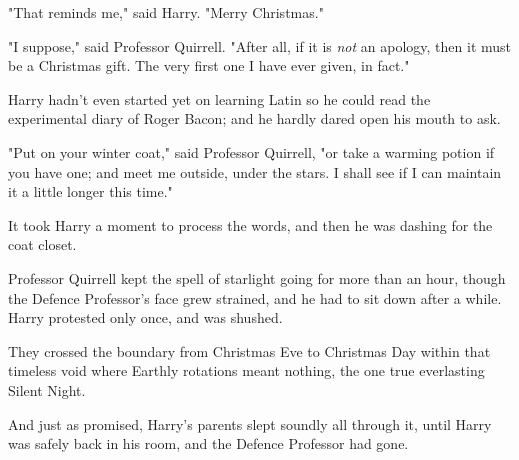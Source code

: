 "That reminds me," said Harry. "Merry Christmas."

"I suppose," said Professor Quirrell. "After all, if it is \emph{not} an
apology, then it must be a Christmas gift. The very first one I have ever
given, in fact."

Harry hadn’t even started yet on learning Latin so he could read the
experimental diary of Roger Bacon; and he hardly dared open his mouth to ask.

"Put on your winter coat," said Professor Quirrell, "or take a warming potion
if you have one; and meet me outside, under the stars. I shall see if I can
maintain it a little longer this time."

It took Harry a moment to process the words, and then he was dashing for the
coat closet.

Professor Quirrell kept the spell of starlight going for more than an hour,
though the Defence Professor’s face grew strained, and he had to sit down after
a while. Harry protested only once, and was shushed.

They crossed the boundary from Christmas Eve to Christmas Day within that
timeless void where Earthly rotations meant nothing, the one true everlasting
Silent Night.

And just as promised, Harry’s parents slept soundly all through it, until Harry
was safely back in his room, and the Defence Professor had gone.
